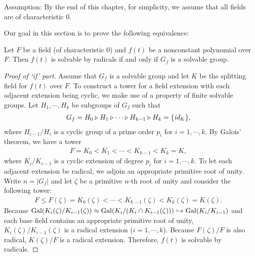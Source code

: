 \begin{center}
    Assumption: By the end of this chapter, for simplicity, we assume that all fields are of characteristic 0.
\end{center}
Our goal in this section is to prove the following equivalence:
\begin{thm}
    Let $F$ be a field (of characteristic 0) and $f(t)$ be a nonconstant polynomial over $F$.
    Then $f(t)$ is solvable by radicals if and only if $G_f$ is a solvable group.
\end{thm}
\begin{proof}[Proof of `if' part]
    Assume that $G_f$ is a solvable group and let $K$ be the splitting field for $f(t)$ over $F$.
    \color{teal}To construct a tower for a field extension with each adjacent extension being cyclic, we make use of a property of finite solvable groups\color{black}.
    Let $H_1, \cdots, H_k$ be subgroups of $G_f$ such that
    \begin{align*}
        G_f=H_0\triangleright H_1\triangleright \cdots\triangleright H_{k-1}\triangleright H_k=\{\textit{id}_{K}\},
    \end{align*}
    where $H_{i-1}/H_i$ is a cyclic group of a prime order $p_i$ for $i=1, \cdots, k$.
    By Galois' theorem, we have a tower
    \begin{align*}
        F=K_0<K_1<\cdots<K_{k-1}<K_k=K,
    \end{align*}
    where $K_i/K_{i-1}$ is a cyclic extension of degree $p_i$ for $i=1, \cdots, k$.
    \color{teal}To let each adjacent extension be radical, we adjoin an appropriate primitive root of unity\color{black}.
    Write $n=|G_f|$ and let $\zeta$ be a primitive $n$-th root of unity and consider the following tower:
    \begin{align*}
        F\leq F(\zeta) = K_0(\zeta) < \cdots < K_{k-1}(\zeta) < K_k(\zeta)=K(\zeta).
    \end{align*}
    Because ${\textrm{Gal}({K_i(\zeta)/K_{i-1}(\zeta)})}\approx {\textrm{Gal}({K_i/(K_i\cap K_{i-1}(\zeta))})}\hookrightarrow {\textrm{Gal}({K_i/K_{i-1}})}$ and each base field contains an appropriate primitive root of unity, $K_i(\zeta)/K_{i-1}(\zeta)$ is a radical extension ($i=1, \cdots, k$).
    Because $F(\zeta)/F$ is also radical, $K(\zeta)/F$ is a radical extension.
    Therefore, $f(t)$ is solvable by radicals.
\end{proof}
